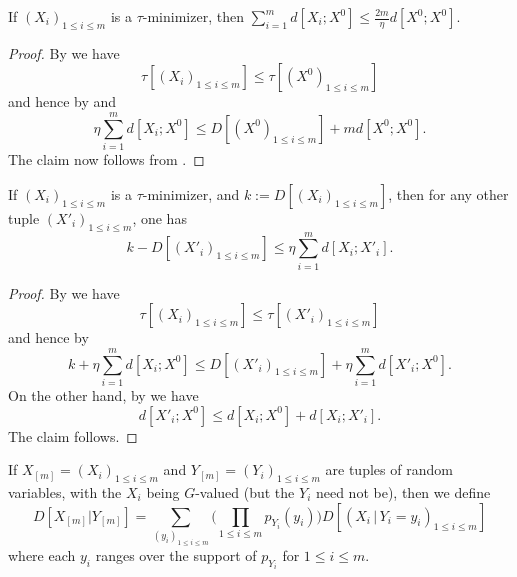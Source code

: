 \begin{proposition}\label{tau-ref}\leanok  If $(X_i)_{1 \leq i \leq m}$ is a $\tau$-minimizer, then $\sum_{i=1}^m d[X_i; X^0] \leq \frac{2m}{\eta} d[X^0; X^0]$.
\end{proposition}

\begin{proof}\leanok  By  we have
  $$ \tau[ (X_i)_{1 \leq i \leq m}] \leq \tau[ (X^0)_{1 \leq i \leq m}]$$
and hence by  and 
$$ \eta \sum_{i=1}^m d[X_i; X^0] \leq D[(X^0)_{1 \leq i \leq m}] + m d[X^0; X^0].$$
The claim now follows from .
\end{proof}

\begin{lemma}\label{multidist-lower}\leanok  If  $(X_i)_{1 \leq i \leq m}$ is a $\tau$-minimizer, and $k := D[(X_i)_{1 \leq i \leq m}]$, then for any other tuple $(X'_i)_{1 \leq i \leq m}$, one has
  $$ k - D[(X'_i)_{1 \leq i \leq m}] \leq \eta \sum_{i=1}^m d[X_i; X'_i].$$
\end{lemma}

\begin{proof}\leanok
  By  we have
  $$ \tau[ (X_i)_{1 \leq i \leq m}] \leq \tau[ (X'_i)_{1 \leq i \leq m}]$$
  and hence by 
  $$ k + \eta \sum_{i=1}^m d[X_i; X^0] \leq D[(X'_i)_{1 \leq i \leq m}] + \eta \sum_{i=1}^m d[X'_i; X^0].$$
  On the other hand, by  we have
  $$ d[X'_i; X^0] \leq d[X_i; X^0] + d[X_i; X'_i].$$
  The claim follows.
\end{proof}

\begin{definition}\label{cond-multidist-def}
  \leanok If $X_{[m]} = (X_i)_{1 \leq i \leq m}$ and $Y_{[m]} = (Y_i)_{1 \leq i \leq m}$ are tuples of random variables, with the $X_i$ being $G$-valued (but the $Y_i$ need not be), then we define
  \begin{equation}\label{multi-def-cond-alt}
    D[ X_{[m]} | Y_{[m]} ] = \sum_{(y_i)_{1 \leq i \leq m}} \biggl(\prod_{1 \leq i \leq m} p_{Y_i}(y_i)\biggr) D[ (X_i \,|\, Y_i \mathop{=}y_i)_{1 \leq i \leq m}]
  \end{equation}
  where each $y_i$ ranges over the support of $p_{Y_i}$ for $1 \leq i \leq m$.
\end{definition}

